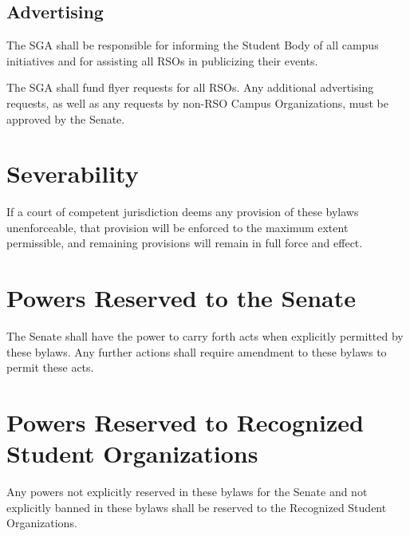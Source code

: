 \documentclass[12pt]{scrreprt}
\begin{document}
\section{Advertising}
The SGA shall be responsible for informing the Student Body of all campus 
initiatives and for assisting all RSOs in publicizing their events. 

The SGA shall fund flyer requests for all RSOs. Any additional advertising 
requests, as well as any requests by non-RSO Campus Organizations, must be 
approved by the Senate. 

\chapter{Severability}
If a court of competent jurisdiction deems any provision of these bylaws 
unenforceable, that provision will be enforced to the maximum extent 
permissible, and remaining provisions will remain in full force and effect. 

\chapter{Powers Reserved to the Senate} \label{sec:senate_powers}
The Senate shall have the power to carry forth acts when explicitly permitted 
by these bylaws. Any further actions shall require amendment to these bylaws 
to permit these acts. 

\chapter{Powers Reserved to Recognized Student Organizations} \label{sec:rso_powers}
Any powers not explicitly reserved in these bylaws for the Senate and not 
explicitly banned in these bylaws shall be reserved to the Recognized Student 
Organizations.
\end{document}
